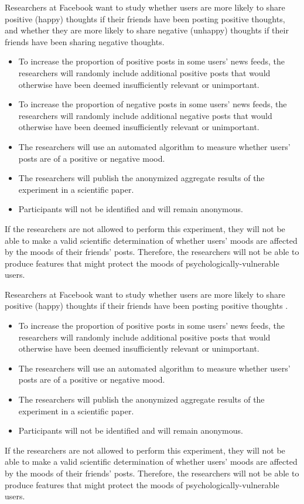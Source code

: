 Researchers at Facebook want to study whether users are more likely to share positive (happy) thoughts if their friends have been posting positive thoughts, and whether they are more likely to share negative (unhappy) thoughts if their friends have been sharing negative thoughts.
\begin{itemize}
\item To increase the proportion of positive posts in some users' news feeds, the researchers will randomly include additional positive posts that would otherwise have been deemed insufficiently relevant or unimportant.
\item To increase the proportion of negative posts in some users' news feeds, the researchers will randomly include additional negative posts that would otherwise have been deemed insufficiently relevant or unimportant.
\item The researchers will use an automated algorithm to measure whether users' posts are of a positive or negative mood.
\item The researchers will publish the anonymized aggregate results of the experiment in a scientific paper.
\item Participants will not be identified and will remain anonymous.
\end{itemize}
If the researchers are not allowed to perform this experiment, they will not be able to make a valid scientific determination of whether users' moods are affected by the moods of their friends' posts. Therefore, the researchers will not be able to produce features that might protect the moods of psychologically-vulnerable users.




Researchers at Facebook want to study whether users are more likely to share positive (happy) thoughts if their friends have been posting positive thoughts .
\begin{itemize}
\item To increase the proportion of positive posts in some users' news feeds, the researchers will randomly include additional positive posts that would otherwise have been deemed insufficiently relevant or unimportant.
 \item The researchers will use an automated algorithm to measure whether users' posts are of a positive or negative mood.
\item The researchers will publish the anonymized aggregate results of the experiment in a scientific paper.
\item Participants will not be identified and will remain anonymous.
\end{itemize}
If the researchers are not allowed to perform this experiment, they will not be able to make a valid scientific determination of whether users' moods are affected by the moods of their friends' posts. Therefore, the researchers will not be able to produce features that might protect the moods of psychologically-vulnerable users.




